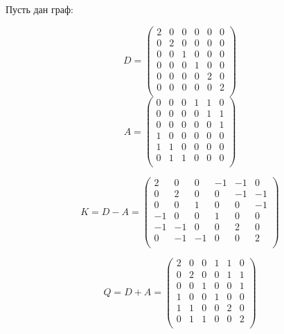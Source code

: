 \begin{example}
Пусть дан граф:
  \begin{center}
  \end{center}
  $$ D =
  \left({
  \begin{array}{rrrrrrrr}
  2 & 0 & 0 & 0 & 0 & 0 \\
  0 & 2 & 0 & 0 & 0 & 0 \\
  0 & 0 & 1 & 0 & 0 & 0 \\
  0 & 0 & 0 & 1 & 0 & 0 \\
  0 & 0 & 0 & 0 & 2 & 0 \\
  0 & 0 & 0 & 0 & 0 & 2 \\
  \end{array}
  }\right)
$$
$$ A =
  \left({
  \begin{array}{rrrrrrrr}
  0 & 0 & 0 & 1 & 1 & 0 \\
  0 & 0 & 0 & 0 & 1 & 1 \\
  0 & 0 & 0 & 0 & 0 & 1 \\
  1 & 0 & 0 & 0 & 0 & 0 \\
  1 & 1 & 0 & 0 & 0 & 0 \\
  0 & 1 & 1 & 0 & 0 & 0 \\
  \end{array}
  }\right)
$$

$$ K = D - A =
  \left({
  \begin{array}{rrrrrrrr}
  2  & 0  & 0 & -1 & -1 & 0 \\
  0  & 2  & 0 & 0 & -1 & -1 \\
  0  & 0  & 1 & 0 & 0 & -1 \\
  -1 & 0  & 0 & 1 & 0 & 0 \\
  -1 & -1 & 0 & 0 & 2 & 0 \\
  0  & -1 & -1 & 0 & 0 & 2 \\
  \end{array}
  }\right)
$$


$$ Q = D + A =
  \left({
  \begin{array}{rrrrrrrr}
  2  & 0  & 0 & 1 & 1 & 0 \\
  0  & 2  & 0 & 0 & 1 & 1 \\
  0  & 0  & 1 & 0 & 0 & 1 \\
  1 & 0  & 0 & 1 & 0 & 0 \\
  1 & 1 & 0 & 0 & 2 & 0 \\
  0  & 1 & 1 & 0 & 0 & 2 \\
  \end{array}
  }\right)
$$


\end{example}
